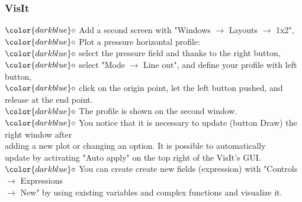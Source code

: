 \documentclass[10pt, hyperref={unicode=true,pdfusetitle, bookmarks=true,bookmarksnumbered=false,bookmarksopen=false, breaklinks=false,pdfborder={0 0 1},backref=true,colorlinks=true,linkcolor=darkblue,pageanchor}]{beamer}
\begin{document}
\begin{frame}
\frametitle{VisIt}
\begin{block}{}

\hspace{1cm} $\color{darkblue}\circ$ {\small{Add a second screen with "Windows $\rightarrow$ Layouts $\rightarrow$ 1x2",}}\\

\hspace{1cm} $\color{darkblue}\circ$ {\small{Plot a pressure horizontal profile:\\}}
\hspace{1.5cm} $\color{darkblue}\diamond$ {\footnotesize{ select the pressure field and thanks to the right button,}} \\ 
\hspace{1.5cm} $\color{darkblue}\diamond$ {\footnotesize{ select "Mode $\rightarrow$ Line out", and define your profile with left button,}} \\
\hspace{1.5cm} $\color{darkblue}\diamond$ {\footnotesize{ click on the origin point, let the left button pushed, and release at the end point.}}\\
\hspace{1.5cm} $\color{darkblue}\diamond$ {\footnotesize{ The profile is shown on the second window.}}\\

\hspace{1cm} $\color{darkblue}\circ$ {\small{You notice that it is necessary to update (button Draw) the right window after \\
\hspace{1.3cm} adding a new plot or changing an option. It is possible to automatically \\
\hspace{1.3cm} update by activating "Auto apply" on the top right of the VisIt's GUI.}}\\

\hspace{1cm} $\color{darkblue}\circ$ {\small{You can create create new fields (expression) with "Controls $\rightarrow$ Expressions \\
\hspace{1.3cm} $\rightarrow$ New" by using existing variables and complex functions and visualize it.}}\\


\end{block}
\end{frame}
\end{document}
